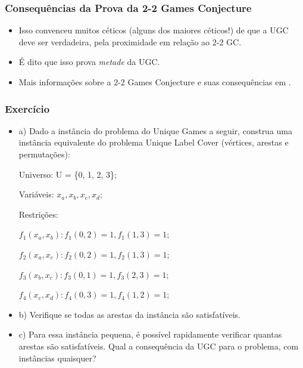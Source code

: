 \documentclass[11pt, handout]{beamer}
\begin{document}
\begin{frame}[<+->]
    \frametitle{Consequências da Prova da 2-2 Games Conjecture}
    \begin{itemize}
        \item Isso convenceu muitos céticos (alguns dos maiores céticos!) de que a UGC deve ser verdadeira, pela proximidade em relação ao 2-2 GC.
        \item É dito que isso prova \emph{metade} da UGC.
        \item Mais informações sobre a 2-2 Games Conjecture e suas consequências em \cite{history}.
    \end{itemize}
\end{frame}

\begin{frame}
  \frametitle{Exercício}
  \begin{itemize}
        \item a) Dado a instância do problema do Unique Games a seguir, construa uma instância equivalente do problema Unique Label Cover (vértices, arestas e permutações):
    
    Universo: U = \{0, 1, 2, 3\};
    
    Variáveis: $x_a, x_b, x_c, x_d$;
    
    Restrições:
    
    $f_1(x_a,x_b): f_1(0,2) = 1,f_1(1,3) = 1;$
    
    $f_2(x_a,x_c): f_2(0,2) = 1,f_2(1,3) = 1;$
    
    $f_3(x_b,x_c): f_3(0,1) = 1,f_3(2,3) = 1;$
    
    $f_4(x_c,x_d): f_4(0,3) = 1,f_4(1,2) = 1;$
    
    \item b) Verifique se todas as arestas da instância são satisfatíveis.
    
    \item c) Para essa instância pequena, é possível rapidamente verificar quantas arestas são satisfatíveis. Qual a consequência da UGC para o problema, com instâncias quaisquer?
    \end{itemize}  
\end{frame}

\begin{frame}



\end{frame}
\end{document}
